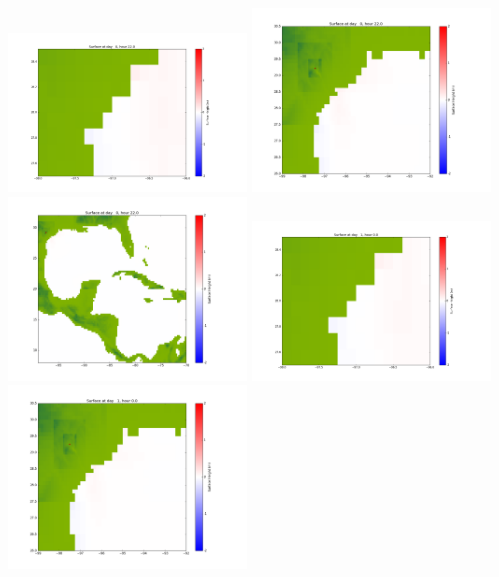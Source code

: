 \documentclass[11pt]{article}
\begin{document}
\vskip 10pt 
\includegraphics[width=0.475\textwidth]{frame0035fig1001.png}
\includegraphics[width=0.475\textwidth]{frame0035fig1002.png}
\vskip 10pt 
\includegraphics[width=0.475\textwidth]{frame0035fig1003.png}
\vskip 10pt 
\includegraphics[width=0.475\textwidth]{frame0036fig1001.png}
\includegraphics[width=0.475\textwidth]{frame0036fig1002.png}
\end{document}
